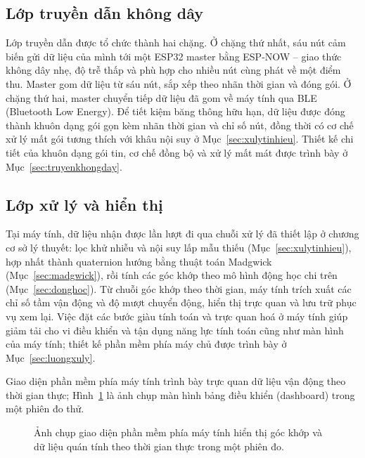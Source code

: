 \documentclass[../DoAn.tex]{subfiles}
\begin{document}
\subsection{Lớp truyền dẫn không dây}
\label{subsec:kt_truyen}
Lớp truyền dẫn được tổ chức thành hai chặng. Ở chặng thứ nhất, sáu nút cảm biến
gửi dữ liệu của mình tới một ESP32 master bằng ESP-NOW -- giao thức không dây nhẹ,
độ trễ thấp và phù hợp cho nhiều nút cùng phát về một điểm thu. Master gom dữ liệu
từ sáu nút, sắp xếp theo nhãn thời gian và đóng gói. Ở chặng thứ hai, master
chuyển tiếp dữ liệu đã gom về máy tính qua BLE (Bluetooth Low Energy). Để tiết kiệm băng thông hữu hạn, dữ
liệu được đóng thành khuôn dạng gói gọn kèm nhãn thời gian và chỉ số nút, đồng
thời có cơ chế xử lý mất gói tương thích với khâu nội suy ở
Mục~\ref{sec:xulytinhieu}. Thiết kế chi tiết của khuôn dạng gói tin, cơ chế đồng
bộ và xử lý mất mát được trình bày ở Mục~\ref{sec:truyenkhongday}.

\subsection{Lớp xử lý và hiển thị}
\label{subsec:kt_xuly}
Tại máy tính, dữ liệu nhận được lần lượt đi qua chuỗi xử lý đã thiết lập ở chương
cơ sở lý thuyết: lọc khử nhiễu và nội suy lấp mẫu thiếu (Mục~\ref{sec:xulytinhieu}),
hợp nhất thành quaternion hướng bằng thuật toán Madgwick (Mục~\ref{sec:madgwick}),
rồi tính các góc khớp theo mô hình động học chi trên (Mục~\ref{sec:donghoc}). Từ
chuỗi góc khớp theo thời gian, máy tính trích xuất các chỉ số tầm vận động và độ
mượt chuyển động, hiển thị trực quan và lưu trữ phục vụ xem lại. Việc đặt các bước
giàu tính toán và trực quan hoá ở máy tính giúp giảm tải cho vi điều khiển và tận
dụng năng lực tính toán cũng như màn hình của máy tính; thiết kế phần mềm phía máy
chủ được trình bày ở Mục~\ref{sec:luongxuly}.

Giao diện phần mềm phía máy tính trình bày trực quan dữ liệu vận động theo thời
gian thực; Hình~\ref{fig:dashboard} là ảnh chụp màn hình bảng điều khiển
(dashboard) trong một phiên đo thử.

\begin{figure}[h]
    \centering
    \caption{Ảnh chụp giao diện phần mềm phía máy tính hiển thị góc khớp và dữ liệu quán tính theo thời gian thực trong một phiên đo.}
    \label{fig:dashboard}
\end{figure}
\end{document}
